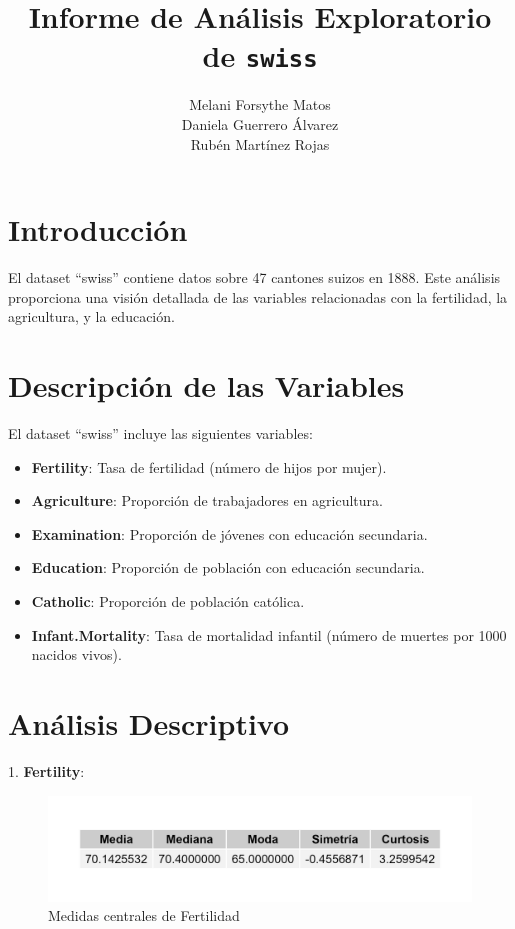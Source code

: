 \documentclass{article}
\title{Informe de Análisis Exploratorio de \texttt{swiss}}
\author{
  Melani Forsythe Matos \\
  Daniela Guerrero Álvarez \\
  Rubén Martínez Rojas
}
\date{} %
\begin{document}
\maketitle

\newpage %

\section{Introducción}
El dataset ``swiss'' contiene datos sobre 47 cantones suizos en 1888. Este análisis proporciona una visión detallada de las variables relacionadas con la fertilidad, la agricultura, y la educación.

\section{Descripción de las Variables}
El dataset ``swiss'' incluye las siguientes variables:
\begin{itemize}
    \item \textbf{Fertility}: Tasa de fertilidad (número de hijos por mujer).
    \item \textbf{Agriculture}: Proporción de trabajadores en agricultura.
    \item \textbf{Examination}: Proporción de jóvenes con educación secundaria.
    \item \textbf{Education}: Proporción de población con educación secundaria.
    \item \textbf{Catholic}: Proporción de población católica.
    \item \textbf{Infant.Mortality}: Tasa de mortalidad infantil (número de muertes por 1000 nacidos vivos).
\end{itemize}

\section*{Análisis Descriptivo}

1. \textbf{Fertility}:
\begin{figure}[h!]
 \centering
 \includegraphics[width=\textwidth]{Swiss/Fertility_central.png}
 \caption{Medidas centrales de Fertilidad}
\end{figure}
\end{document}
